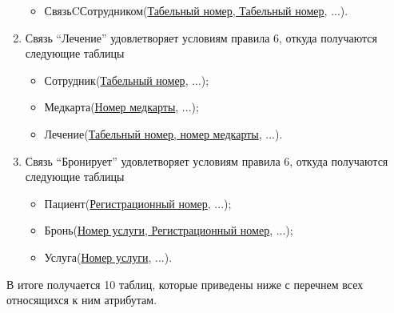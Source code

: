 \documentclass[14pt,a4paper,russian]{extreport}
\begin{document}
\begin{enumerate}
\begin{itemize}
            \item СвязьCСотрудником(\underline{Табельный номер, Табельный номер}, ...).
        \end{itemize}
    \item Связь ``Лечение'' удовлетворяет условиям правила 6, откуда получаются следующие таблицы
        \begin{itemize}
            \item Сотрудник(\underline{Табельный номер}, ...);
            \item Медкарта(\underline{Номер медкарты}, ...);
            \item Лечение(\underline{Табельный номер, номер медкарты}, ...).
        \end{itemize}
    \item Связь ``Бронирует'' удовлетворяет условиям правила 6, откуда получаются следующие
        таблицы
        \begin{itemize}
            \item Пациент(\underline{Регистрационный номер}, ...);
            \item Бронь(\underline{Номер услуги, Регистрационный номер}, ...);
            \item Услуга(\underline{Номер услуги}, ...).
        \end{itemize}
\end{enumerate}
В итоге получается 10 таблиц, которые приведены ниже с перечнем всех относящихся к ним атрибутам.
\end{document}
